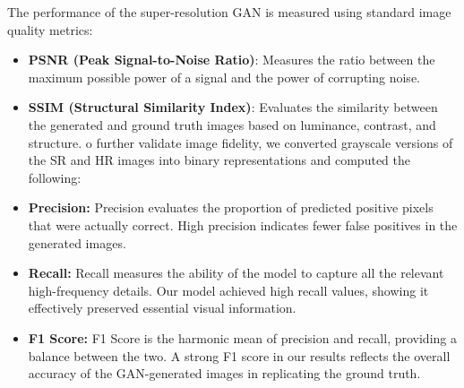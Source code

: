 The performance of the super-resolution GAN is measured using standard image quality metrics:
\begin{itemize}
    \item \textbf{PSNR (Peak Signal-to-Noise Ratio)}: Measures the ratio between the maximum possible power of a signal and the power of corrupting noise.
    \item \textbf{SSIM (Structural Similarity Index)}: Evaluates the similarity between the generated and ground truth images based on luminance, contrast, and structure.
    o further validate image fidelity, we converted grayscale versions of the SR and HR images into binary representations and computed the following:

\item \textbf{Precision:}
Precision evaluates the proportion of predicted positive pixels that were actually correct. High precision indicates fewer false positives in the generated images.

\item \textbf{Recall:}
Recall measures the ability of the model to capture all the relevant high-frequency details. Our model achieved high recall values, showing it effectively preserved essential visual information.

\item \textbf{F1 Score:}
F1 Score is the harmonic mean of precision and recall, providing a balance between the two. A strong F1 score in our results reflects the overall accuracy of the GAN-generated images in replicating the ground truth.
\end{itemize}
\vspace{0.5cm}



